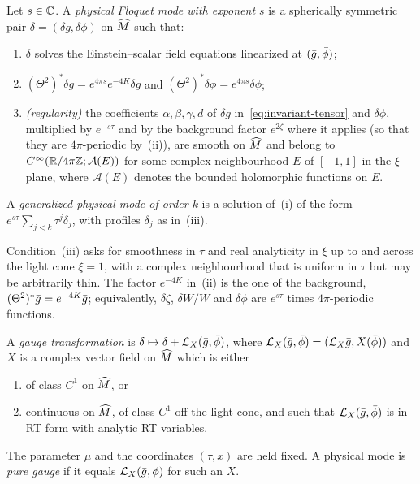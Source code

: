 \begin{definition}\label{def:physical-mode}
Let $s\in\mathbb{C}$. A \emph{physical Floquet mode with exponent $s$} is a spherically symmetric pair
$\delta=(\delta g,\delta\phi)$ on $\widehat M$ such that:
\begin{enumerate}[label=\textup{(\roman*)},leftmargin=*]
\item $\delta$ solves the Einstein--scalar field equations linearized at $(\bar g,\bar\phi)$;
\item $(\Theta^2)^*\delta g=e^{4\pi s}e^{-4K}\delta g$ and $(\Theta^2)^*\delta\phi=e^{4\pi s}\delta\phi$;
\item \emph{(regularity)} the coefficients $\alpha,\beta,\gamma,d$ of $\delta g$ in~\eqref{eq:invariant-tensor}
  and $\delta\phi$, multiplied by $e^{-s\tau}$ and by the background factor $e^{2\zeta}$ where it applies
  (so that they are $4\pi$-periodic by~(ii)), are smooth on $\widehat M$ and belong to $C^\infty(\mathbb{R}/4\pi\mathbb{Z};\mathcal A(E))$
  for some complex neighbourhood $E$ of $[-1,1]$ in the $\xi$-plane, where $\mathcal A(E)$ denotes the bounded
  holomorphic functions on $E$.
\end{enumerate}
A \emph{generalized physical mode of order $k$} is a solution of~(i) of the form
$e^{s\tau}\sum_{j<k}\tau^j\delta_j$, with profiles $\delta_j$ as in~(iii).
\end{definition}

Condition~(iii) asks for smoothness in $\tau$ and real analyticity in $\xi$ up to and across the light cone
$\xi=1$, with a complex neighbourhood that is uniform in $\tau$ but may be arbitrarily thin. The factor
$e^{-4K}$ in~(ii) is the one of the background, $(\Theta^2)^*\bar g=e^{-4K}\bar g$; equivalently,
$\delta\zeta$, $\delta W/W$ and $\delta\phi$ are $e^{s\tau}$ times $4\pi$-periodic functions.

\begin{definition}[Gauge]\label{def:gauge}
A \emph{gauge transformation} is $\delta\mapsto\delta+\mathcal{L}_X(\bar g,\bar\phi)$, where
$\mathcal{L}_X(\bar g,\bar\phi)=(\mathcal{L}_X\bar g,X(\bar\phi))$ and $X$ is a complex vector field on $\widehat M$ which is
either
\begin{enumerate}[label=\textup{(\alph*)},leftmargin=*]
\item of class $C^1$ on $\widehat M$, or
\item continuous on $\widehat M$, of class $C^1$ off the light cone, and such that $\mathcal{L}_X(\bar g,\bar\phi)$ is in
  RT form with analytic RT variables.
\end{enumerate}
The parameter $\mu$ and the coordinates $(\tau,x)$ are held fixed. A physical mode is \emph{pure gauge}
if it equals $\mathcal{L}_X(\bar g,\bar\phi)$ for such an $X$.
\end{definition}

